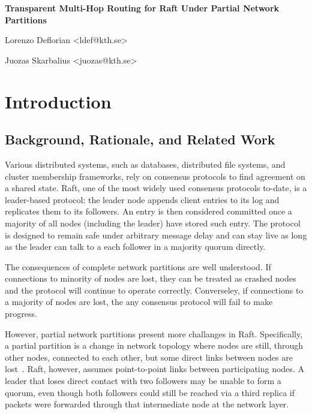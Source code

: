 \documentclass[11pt,a4paper]{article}
\newcommand{\unnumberedheading}[1]{%
  \par\vspace{2pt}{\fontsize{14}{16.5}\selectfont\bfseries #1\par}\vspace{6pt}%
}
\newcommand{\reporttitle}[1]{%
  {\fontsize{16}{19}\selectfont\bfseries #1\par}\vspace{12pt}%
}
\begin{document}
\reporttitle{Transparent Multi-Hop Routing for Raft Under Partial Network Partitions}
\unnumberedheading{Authors}
Lorenzo Deflorian <ldef@kth.se>\par
Juozas Skarbalius <juozas@kth.se>\par
\vspace{2pt}

\section{Introduction}

\subsection{Background, Rationale, and Related Work}
Various distributed systems, such as databases, distributed file systems, and cluster membership frameworks, rely on consensus protocols to find agreement on a shared state.
Raft, one of the most widely used consensus protocols to-date, is a leader-based protocol: the leader node appends client entries to its log and replicates them to its followers.
An entry is then considered committed once a majority of all nodes (including the leader) have stored such entry.
The protocol is designed to remain safe under arbitrary message delay and can stay live as long as the leader can talk to a each follower in a majority quorum directly.

The consequences of complete network partitions are well understood. If connections to minority of nodes are lost, they can be treated as crashed nodes and the protocol will continue to operate correctly.
Converseley, if connections to a majority of nodes are lost, the any consensus protocol will fail to make progress.

However, partial network partitions present more challanges in Raft. Specifically, a partial partition is a change in network topology where nodes are still, through other nodes, connected to each other, but some direct links between nodes are lost~\cite{jensen2021raft,alfatafta2020nifty}.
Raft, however, assumes point-to-point links between participating nodes. A leader that loses direct contact with two followers may be unable to form a quorum, even though both followers could still be reached via a third replica if packets were forwarded through that intermediate node at the network layer.
\end{document}
